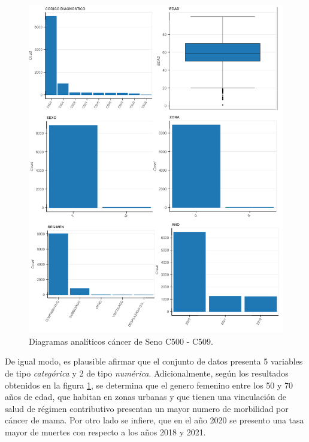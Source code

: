 \begin{figure}[h!]
	\centering
	\includegraphics[width=1 
	\linewidth]{IMAGENES/EDA_BREAST}
	\caption{Diagramas analíticos cáncer de Seno C500 - C509.}
	\label{EDA}
\end{figure}

\newpage 
De igual modo, es plausible afirmar que el conjunto de datos presenta 5 variables de tipo \textit{categórica} y 2 de tipo \textit{numérica}. Adicionalmente, según los resultados obtenidos en la figura \ref{EDA}, se determina que el genero femenino entre los 50 y 70 años de edad, que habitan en zonas urbanas y que tienen una vinculación de salud de régimen contributivo presentan un mayor numero de morbilidad por cáncer de mama. Por otro lado se infiere, que en el año 2020 se presento una tasa mayor de muertes con respecto a los años 2018 y 2021.

